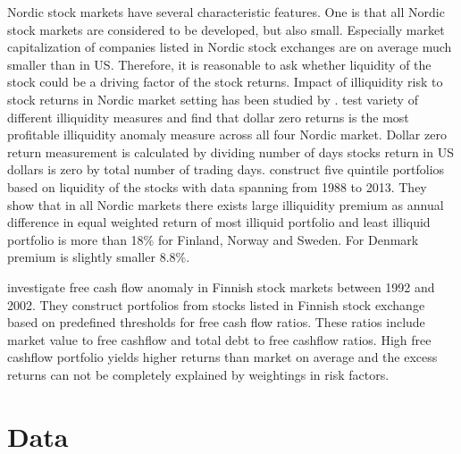 \documentclass[12pt]{article}
\begin{document}
Nordic stock markets have several characteristic features. One is that all Nordic stock markets are considered to be developed, but also small. Especially market capitalization of companies listed in Nordic stock exchanges are on average much smaller than in US. Therefore, it is reasonable to ask whether liquidity of the stock could be a driving factor of the stock returns. Impact of illiquidity risk to stock returns in Nordic market setting has been studied by \citet{Butt2018}. \citeauthor{Butt2018} test variety of different illiquidity measures and find that dollar zero returns is the most profitable illiquidity anomaly measure across all four Nordic market. Dollar zero return measurement is calculated by dividing number of days stocks return in US dollars is zero by total number of trading days. \citeauthor{Butt2018} construct five quintile portfolios based on liquidity of the stocks with data spanning from 1988 to 2013. They show that in all Nordic markets there exists large illiquidity premium as annual difference in equal weighted return of most illiquid portfolio and least illiquid portfolio is more than 18\% for Finland, Norway and Sweden. For Denmark premium is slightly smaller 8.8\%. \par

\citet{jokipii2006free} investigate free cash flow anomaly in Finnish stock markets between 1992 and 2002. They construct portfolios from stocks listed in Finnish stock exchange based on predefined thresholds for free cash flow ratios. These ratios include market value to free cashflow and total debt to free cashflow ratios. High free cashflow portfolio yields higher returns than market on average and the excess returns can not be completely explained by weightings in \citet{FAMA19933} risk factors. \par

\section{Data}\label{Data}
\end{document}
